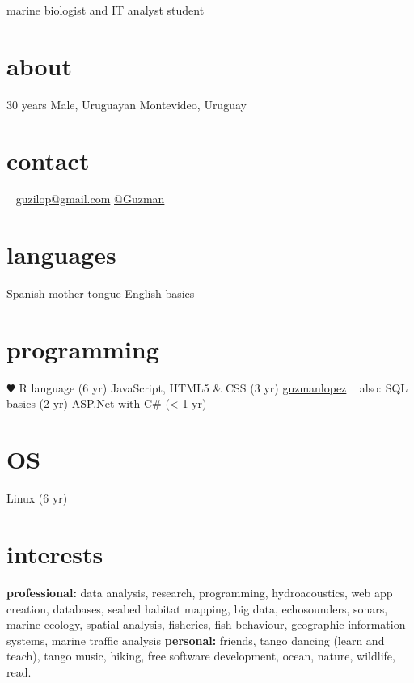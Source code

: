 \documentclass[]{friggeri-cv} %
\begin{document}
{marine biologist and IT analyst student} %


\begin{aside} %
	
\section{about}
30 years
Male, Uruguayan	
{\color{brown} \faHome{}} Montevideo, Uruguay
\section{contact}~
{\color{green} \faEnvelope{}} \href{mailto:guzilop@gmail.com}{guzilop@gmail.com}
{\color{blue} \faSend{}} \href{https://telegram.me/Guzman}{@Guzman}
\section{languages}
Spanish mother tongue
English basics
\section{programming}
{\color{red} $\varheartsuit$} R language (6 yr)
JavaScript, HTML5 \& CSS (3 yr)
\faGithubAlt{} \href{https://github.com/guzmanlopez}{guzmanlopez}
~
also:
SQL basics (2 yr)
ASP.Net with C\# (< 1 yr)
\section{OS}
{\color{gray}\FA \faLinux} Linux (6 yr)
\end{aside}

\section{interests}

\textbf{professional:} data analysis, research, programming, hydroacoustics, web app creation, databases, seabed habitat mapping, big data, echosounders, sonars, marine ecology, spatial analysis, fisheries, fish behaviour, geographic information systems, marine traffic analysis \textbf{personal:} friends, tango dancing (learn and teach), tango music, hiking, free software development, ocean, nature, wildlife, read.\\
\end{document}
